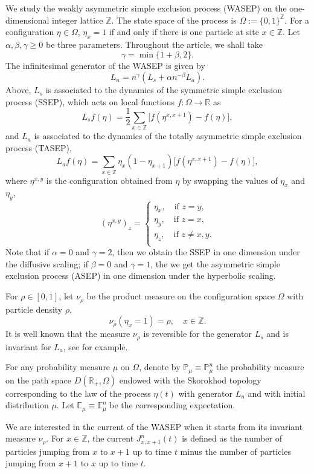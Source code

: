 \documentclass[reqno,11pt]{amsart}
\numberwithin{equation}{section}
\newcommand{\E}{\mathbb{E}}
\newcommand{\Pbb}{\mathbb{P}}
\newcommand{\R}{\mathbb{R}}
\newcommand{\Z}{\mathbb{Z}}
\begin{document}
We study the weakly asymmetric simple exclusion process (WASEP) on the one-dimensional integer lattice $\Z$. The state space of the process is $\Omega:= \{0,1\}^\Z$. For a configuration $\eta \in \Omega$, $\eta_x = 1$ if and only if there is one particle at site $x \in \Z$. Let $\alpha ,\beta,\gamma\geq 0$ be three parameters. Throughout the article, we shall take
\[\gamma = \min \{1+\beta, 2\}.\]
The infinitesimal generator of the WASEP is given by 
\[L_n = n^{\gamma} (L_s + \alpha n^{-\beta}L_a).\] 
Above, $L_s$ is associated to the dynamics of the symmetric simple exclusion process (SSEP), which acts on local functions $f: \Omega \rightarrow \R$ as
\[L_s f (\eta) = \frac{1}{2} \sum_{x \in \Z} \big[ f(\eta^{x,x+1} )- f(\eta)\big],\]
and $L_a$ is associated to the dynamics of the totally asymmetric simple exclusion process (TASEP),
\[L_a f (\eta) = \sum_{x \in \Z} \eta_x (1-\eta_{x+1})\big[ f(\eta^{x,x+1}) - f(\eta)\big],\]
where $\eta^{x,y}$ is the configuration obtained from $\eta$ by swapping the values of $\eta_x$ and $\eta_y$,
\[(\eta^{x,y})_{z} = \begin{cases}
 \eta_x, \quad \text{if } z = y,\\
  \eta_y, \quad \text{if } z = x,\\
   \eta_z, \quad \text{if } z \neq x, y.\\
\end{cases}\]
Note that if $\alpha = 0$ and $\gamma = 2$, then we obtain the  SSEP  in one dimension under the diffusive scaling; if $\beta = 0$ and $\gamma=1$, the we get the asymmetric simple exclusion process (ASEP) in one dimension under the hyperbolic scaling.



For $\rho \in [0,1]$, let $\nu_{\rho}$ be the product measure on the configuration space $\Omega$ with particle density $\rho$,
\[\nu_\rho (\eta_x = 1) = \rho, \quad  x \in \Z.\]
It is well known that the measure $\nu_\rho$ is reversible for the generator $L_s$ and is invariant for $L_a$, see \cite{liggettips} for example.


For any probability measure $\mu$ on $\Omega$, denote by $\Pbb_{\mu} \equiv \Pbb_{\mu}^n$ the probability measure on the path space $D(\R_+,\Omega)$ endowed with the Skorokhod topology corresponding to the law of the process $\eta(t)$ with generator $L_n$ and with initial distribution $\mu$. Let $\E_\mu \equiv \E_\mu^n$ be the corresponding expectation. 

We are interested in the current of the WASEP when it starts from its invariant measure $\nu_\rho$. For $x \in \Z$, the current $J^n_{x,x+1} (t)$ is defined as the number of particles jumping from $x$ to $x+1$ up to time $t$ minus the number of particles jumping from $x+1$ to $x$ up to time $t$. 
\end{document}
